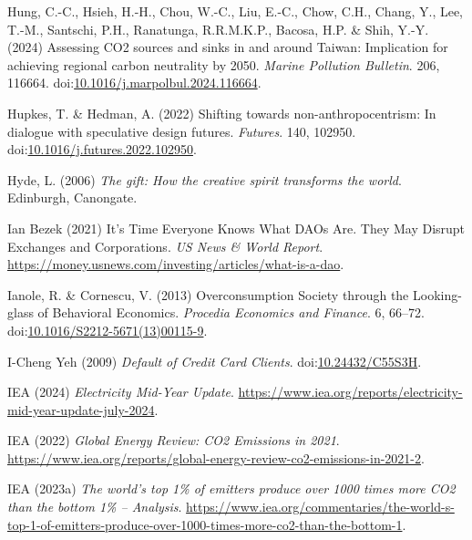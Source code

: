 \documentclass[
  letterpaper,
  DIV=11,
  numbers=noendperiod]{scrartcl}
\newlength{\cslhangindent}
\newenvironment{CSLReferences}[2] %
 {\begin{list}{}{%
  \setlength{\itemindent}{0pt}
  \setlength{\leftmargin}{0pt}
  \setlength{\parsep}{0pt}
  \ifodd #1
   \setlength{\leftmargin}{\cslhangindent}
   \setlength{\itemindent}{-1\cslhangindent}
  \fi
  \setlength{\itemsep}{#2\baselineskip}}}
 {\end{list}}
\begin{document}
\begin{CSLReferences}{0}{1}
Hung, C.-C., Hsieh, H.-H., Chou, W.-C., Liu, E.-C., Chow, C.H., Chang,
Y., Lee, T.-M., Santschi, P.H., Ranatunga, R.R.M.K.P., Bacosa, H.P. \&
Shih, Y.-Y. (2024) Assessing {CO2} sources and sinks in and around
{Taiwan}: {Implication} for achieving regional carbon neutrality by
2050. \emph{Marine Pollution Bulletin}. 206, 116664.
doi:\href{https://doi.org/10.1016/j.marpolbul.2024.116664}{10.1016/j.marpolbul.2024.116664}.

Hupkes, T. \& Hedman, A. (2022) Shifting towards non-anthropocentrism:
{In} dialogue with speculative design futures. \emph{Futures}. 140,
102950.
doi:\href{https://doi.org/10.1016/j.futures.2022.102950}{10.1016/j.futures.2022.102950}.

Hyde, L. (2006) \emph{The gift: How the creative spirit transforms the
world}. Edinburgh, Canongate.

Ian Bezek (2021) It's {Time Everyone Knows What DAOs Are}. {They May
Disrupt Exchanges} and {Corporations}. \emph{US News \& World Report}.
\url{https://money.usnews.com/investing/articles/what-is-a-dao}.

Ianole, R. \& Cornescu, V. (2013) Overconsumption {Society} through the
{Looking-glass} of {Behavioral Economics}. \emph{Procedia Economics and
Finance}. 6, 66--72.
doi:\href{https://doi.org/10.1016/S2212-5671(13)00115-9}{10.1016/S2212-5671(13)00115-9}.

I-Cheng Yeh (2009) \emph{Default of {Credit Card Clients}}.
doi:\href{https://doi.org/10.24432/C55S3H}{10.24432/C55S3H}.

IEA (2024) \emph{Electricity {Mid-Year Update}}.
\url{https://www.iea.org/reports/electricity-mid-year-update-july-2024}.

IEA (2022) \emph{Global {Energy Review}: {CO2 Emissions} in 2021}.
\url{https://www.iea.org/reports/global-energy-review-co2-emissions-in-2021-2}.

IEA (2023a) \emph{The world's top 1\% of emitters produce over 1000
times more {CO2} than the bottom 1\% -- {Analysis}}.
\url{https://www.iea.org/commentaries/the-world-s-top-1-of-emitters-produce-over-1000-times-more-co2-than-the-bottom-1}.


\end{CSLReferences}
\end{document}
